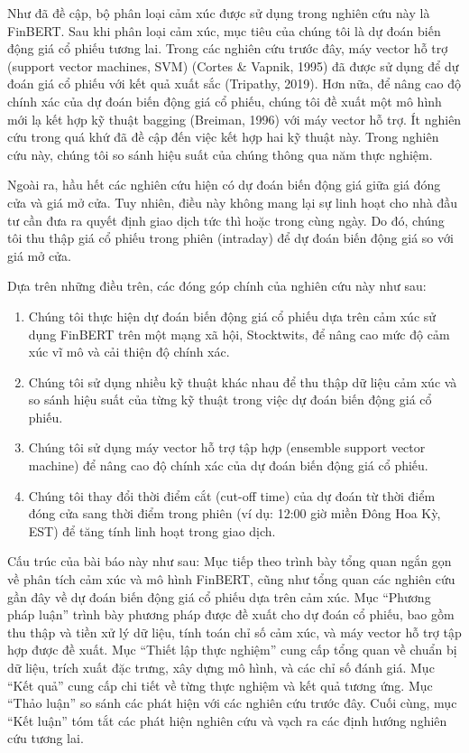 Như đã đề cập, bộ phân loại cảm xúc được sử dụng trong nghiên cứu này là FinBERT. Sau khi phân loại cảm xúc, mục tiêu của chúng tôi là dự đoán biến động giá cổ phiếu tương lai. Trong các nghiên cứu trước đây, máy vector hỗ trợ (support vector machines, SVM) (Cortes \& Vapnik, 1995) đã được sử dụng để dự đoán giá cổ phiếu với kết quả xuất sắc (Tripathy, 2019). Hơn nữa, để nâng cao độ chính xác của dự đoán biến động giá cổ phiếu, chúng tôi đề xuất một mô hình mới lạ kết hợp kỹ thuật bagging (Breiman, 1996) với máy vector hỗ trợ. Ít nghiên cứu trong quá khứ đã đề cập đến việc kết hợp hai kỹ thuật này. Trong nghiên cứu này, chúng tôi so sánh hiệu suất của chúng thông qua năm thực nghiệm.

Ngoài ra, hầu hết các nghiên cứu hiện có dự đoán biến động giá giữa giá đóng cửa và giá mở cửa. Tuy nhiên, điều này không mang lại sự linh hoạt cho nhà đầu tư cần đưa ra quyết định giao dịch tức thì hoặc trong cùng ngày. Do đó, chúng tôi thu thập giá cổ phiếu trong phiên (intraday) để dự đoán biến động giá so với giá mở cửa.

Dựa trên những điều trên, các đóng góp chính của nghiên cứu này như sau:
\begin{enumerate}
  \item Chúng tôi thực hiện dự đoán biến động giá cổ phiếu dựa trên cảm xúc sử dụng FinBERT trên một mạng xã hội, Stocktwits, để nâng cao mức độ cảm xúc vĩ mô và cải thiện độ chính xác.
  \item Chúng tôi sử dụng nhiều kỹ thuật khác nhau để thu thập dữ liệu cảm xúc và so sánh hiệu suất của từng kỹ thuật trong việc dự đoán biến động giá cổ phiếu.
  \item Chúng tôi sử dụng máy vector hỗ trợ tập hợp (ensemble support vector machine) để nâng cao độ chính xác của dự đoán biến động giá cổ phiếu.
  \item Chúng tôi thay đổi thời điểm cắt (cut-off time) của dự đoán từ thời điểm đóng cửa sang thời điểm trong phiên (ví dụ: 12:00 giờ miền Đông Hoa Kỳ, EST) để tăng tính linh hoạt trong giao dịch.
\end{enumerate}

Cấu trúc của bài báo này như sau: Mục tiếp theo trình bày tổng quan ngắn gọn về phân tích cảm xúc và mô hình FinBERT, cũng như tổng quan các nghiên cứu gần đây về dự đoán biến động giá cổ phiếu dựa trên cảm xúc. Mục ``Phương pháp luận'' trình bày phương pháp được đề xuất cho dự đoán cổ phiếu, bao gồm thu thập và tiền xử lý dữ liệu, tính toán chỉ số cảm xúc, và máy vector hỗ trợ tập hợp được đề xuất. Mục ``Thiết lập thực nghiệm'' cung cấp tổng quan về chuẩn bị dữ liệu, trích xuất đặc trưng, xây dựng mô hình, và các chỉ số đánh giá. Mục ``Kết quả'' cung cấp chi tiết về từng thực nghiệm và kết quả tương ứng. Mục ``Thảo luận'' so sánh các phát hiện với các nghiên cứu trước đây. Cuối cùng, mục ``Kết luận'' tóm tắt các phát hiện nghiên cứu và vạch ra các định hướng nghiên cứu tương lai.

